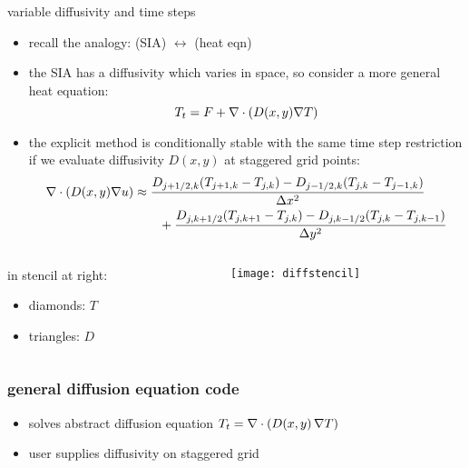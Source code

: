 \begin{frame}{variable diffusivity and time steps}

\begin{itemize}
  \item recall the analogy: \qquad (SIA) $\leftrightarrow$ (heat eqn)
  \item the SIA has a diffusivity which varies in space, so consider a more general heat equation:
  		$$T_t = F + \nabla\cdot \left(D(x,y) \nabla T\right)$$
  \item the explicit method is conditionally stable with the same time step restriction if we evaluate diffusivity $D(x,y)$ at \alert{staggered} grid points:
  \scriptsize
\begin{align*}
\nabla\cdot \left(D(x,y) \nabla u\right) &\approx \frac{D_{j+1/2,k}(T_{j+1,k} - T_{j,k}) - D_{j-1/2,k}(T_{j,k} - T_{j-1,k})}{\Delta x^2} \\
	&\qquad + \frac{D_{j,k+1/2}(T_{j,k+1} - T_{j,k}) - D_{j,k-1/2}(T_{j,k} - T_{j,k-1})}{\Delta y^2}
\end{align*}
\end{itemize}

\vspace{-0.15in}
\small
\begin{columns}
\begin{column}{0.55\textwidth}
in stencil at right:
\begin{itemize}
\item[] diamonds: $T$
\item[] triangles: $D$
\end{itemize}
\end{column}
\begin{column}{0.45\textwidth}
\begin{center}
\texttt{[image: diffstencil]}
\end{center}
\end{column}
\end{columns}
\end{frame}


\begin{frame}
  \frametitle{general diffusion equation code}


\small
\begin{itemize}
\item solves abstract diffusion equation $T_t = \nabla\cdot \left(D(x,y)\, \nabla T\right)$
\item user supplies diffusivity on staggered grid
\end{itemize}
\end{frame}


